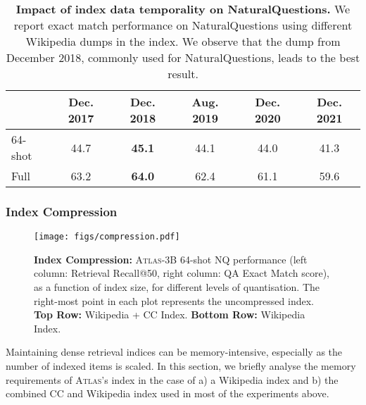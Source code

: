 \documentclass[10pt]{article} \usepackage[preprint]{tmlr}
\newcommand{\Atlas}{\textsc{Atlas}}
\begin{document}
\begin{table}[t]
  \centering
      \caption{\textbf{Impact of index data temporality on NaturalQuestions.}
    We report exact match performance on NaturalQuestions using different Wikipedia dumps in the index.
    We observe that the dump from December 2018, commonly used for NaturalQuestions, leads to the best result.}
        \vspace{0.5em}

  \begin{tabular}{l ccccc}
    \toprule
    & Dec. 2017 & Dec. 2018 & Aug. 2019 & Dec. 2020 & Dec. 2021 \\
    \midrule
    64-shot & 44.7 & \textbf{45.1} & 44.1 & 44.0 & 41.3 \\
    Full    & 63.2 & \textbf{64.0} & 62.4 & 61.1 & 59.6 \\
    \bottomrule
  \end{tabular}

  \label{table:nq_index}
\end{table}










\subsubsection{Index Compression}
\begin{figure}[t]
    \centering
\texttt{[image: figs/compression.pdf]}
\caption{\textbf{Index Compression:} \Atlas{}-3B 64-shot NQ performance (left column: Retrieval Recall@50, right column: QA Exact Match score), as a function of index size, for different levels of quantisation.
    The right-most point in each plot represents the uncompressed index.
  \textbf{Top Row:} Wikipedia + CC Index. \textbf{Bottom Row:} Wikipedia Index.
}
    \label{fig:compressed_indexes}
\end{figure}

Maintaining dense retrieval indices can be memory-intensive, especially as the number of indexed items is scaled.
In this section, we briefly analyse the memory requirements of \Atlas{}'s index in the case of a) a Wikipedia index and b) the combined  CC and Wikipedia index used in most of the experiments above.
\end{document}
